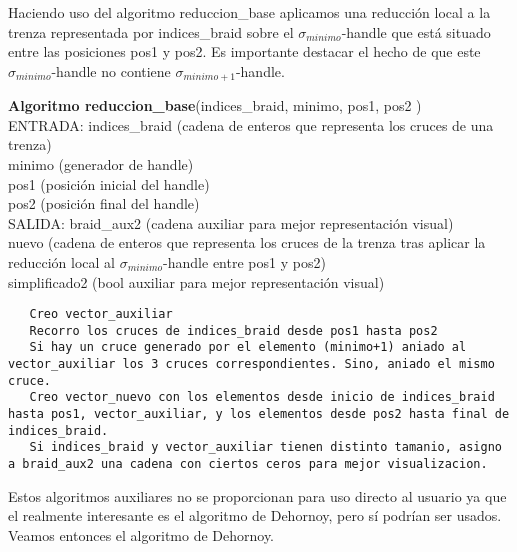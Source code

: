 \bigskip
Haciendo uso del algoritmo reduccion\_base aplicamos una reducción local a la trenza representada por indices\_braid sobre el $\sigma_{minimo}$-handle que está situado entre las posiciones pos1 y pos2. Es importante destacar el hecho de que este $\sigma_{minimo}$-handle  no contiene $\sigma_{minimo+1}$-handle.
\begin{alg}
	\textbf{Algoritmo reduccion\_base}(indices\_braid, minimo, pos1, pos2 )\\
	ENTRADA: indices\_braid (cadena de enteros que representa los cruces de una trenza)\\
	\hspace*{2.2cm} minimo (generador de handle) \\
	\hspace*{2.2cm} pos1 (posición inicial del handle) \\
	\hspace*{2.2cm} pos2 (posición final del handle)\\
	SALIDA: \hspace{0.4cm} braid\_aux2 (cadena auxiliar para mejor representación visual) \\
	\hspace*{2.2cm} nuevo (cadena de enteros que representa los cruces de la trenza tras aplicar la reducción local al $\sigma_{minimo}$-handle entre pos1 y pos2)\\
	\hspace*{2.2cm} simplificado2 (bool auxiliar para mejor representación visual)
	
\begin{lstlisting}
   Creo vector_auxiliar
   Recorro los cruces de indices_braid desde pos1 hasta pos2
   Si hay un cruce generado por el elemento (minimo+1) aniado al vector_auxiliar los 3 cruces correspondientes. Sino, aniado el mismo cruce. 
   Creo vector_nuevo con los elementos desde inicio de indices_braid hasta pos1, vector_auxiliar, y los elementos desde pos2 hasta final de indices_braid.
   Si indices_braid y vector_auxiliar tienen distinto tamanio, asigno a braid_aux2 una cadena con ciertos ceros para mejor visualizacion.
\end{lstlisting}
\end{alg}

Estos algoritmos auxiliares no se proporcionan para uso directo al usuario ya que el realmente interesante es el algoritmo de Dehornoy, pero sí podrían ser usados. Veamos entonces el algoritmo de Dehornoy.\\

